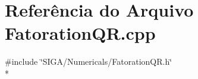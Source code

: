 \section{Referência do Arquivo Fatoration\+Q\+R.\+cpp}
\label{_fatoration_q_r_8cpp}
{\ttfamily \#include \char`\"{}S\+I\+G\+A/\+Numericals/\+Fatoration\+Q\+R.\+h\char`\"{}}\\*
